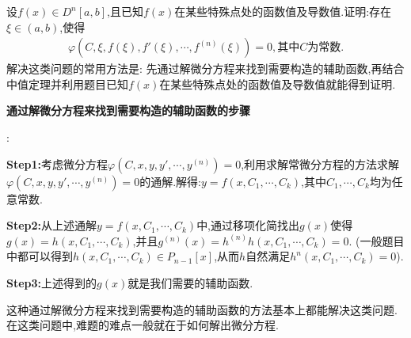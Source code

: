\documentclass[lang=cn,newtx,10pt,scheme=chinese]{../Template/elegantbook}
\begin{document}
\begin{conclusion}
设$f(x)\in D^n\left[ a,b \right]$,且已知$f(x)$在某些特殊点处的函数值及导数值.证明:存在$\xi\in(a,b)$,使得
\begin{align*}
\varphi \left( C,\xi ,f\left( \xi \right) ,f'\left( \xi \right) ,\cdots ,f^{\left( n \right)}\left( \xi \right) \right) =0,\text{其中}C\text{为常数}.
\nonumber
\end{align*}
解决这类问题的常用方法是:
先通过解微分方程来找到需要构造的辅助函数,再结合中值定理并利用题目已知$f(x)$在某些特殊点处的函数值及导数值就能得到证明.

\hypertarget{通过解微分方程来找到需要构造的辅助函数的步骤}{\textbf{通过解微分方程来找到需要构造的辅助函数的步骤}}:

\textbf{Step1:}考虑微分方程$\varphi \left( C,x,y,y',\cdots ,y^{\left( n \right)} \right) =0$,利用求解常微分方程的方法求解$\varphi \left( C,x,y,y',\cdots ,y^{\left( n \right)} \right) =0$的通解.解得:$y=f\left( x,C_1,\cdots ,C_k \right)$,其中$C_1,\cdots,C_k$均为任意常数.

\textbf{Step2:}从上述通解$y=f\left( x,C_1,\cdots ,C_k \right)$中,通过移项化简找出$g(x)$使得$g\left( x \right) =h\left( x,C_1,\cdots ,C_k \right)$,并且$g^{\left( n \right)}\left( x \right) =h^{\left( n \right)}h\left( x,C_1,\cdots ,C_k \right) =0$.
(一般题目中都可以得到$h\left( x,C_1,\cdots ,C_k \right)\in P_{n-1}[x]$,从而$h$自然满足$h^n(x,C_1,\cdots ,C_k)=0$).

\textbf{Step3:}上述得到的$g(x)$就是我们需要的辅助函数.
\end{conclusion}
\begin{remark}
这种通过解微分方程来找到需要构造的辅助函数的方法基本上都能解决这类问题.在这类问题中,难题的难点一般就在于如何解出微分方程.
\end{remark}
\end{document}
